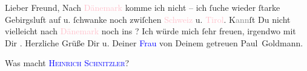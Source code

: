 \pstart
           Lieber Freund, Nach \textcolor{pink}{Dänemark}{}\ledrightnote{\textcolor{pink}{Dänemark}} komme ich nicht – ich ſuche wieder ſtarke Gebirgsluft auf u.
               ſchwanke noch zwiſchen \textcolor{pink}{Schweiz}{}\ledrightnote{\textcolor{pink}{Schweiz}} u. \textcolor{pink}{Tirol}{}\ledrightnote{\textcolor{pink}{Tirol}}. K\textcolor{gray}{ann}ſt Du nicht
               vielleicht nach \textcolor{pink}{Dänemark}{}\ledrightnote{\textcolor{pink}{Dänemark}} noch ins \label{K-L03248-1v}\label{K-L03248-1h}? Ich würde mich ſehr freuen, \strikeout{\textcolor{gray}{da}} irgendwo mit Dir \label{K-L03248-2v}\label{K-L03248-2h}. Herzliche Grüße Dir u.
               Deiner \textcolor{blue}{Frau}{}\ledrightnote{{$\rightarrow$}\textcolor{blue}{Olga Schnitzler}} von Deinem
               getreuen \spacefill\mbox{Paul Goldmann.}\pend
           
\pstart
           \noindent{}Was macht \textsc{\textcolor{blue}{Heinrich Schnitzler}{}\ledrightnote{\textcolor{blue}{Heinrich Schnitzler}}}?\pend
           \endnumbering{}  
      